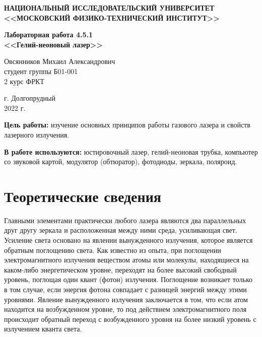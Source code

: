 \documentclass[a4paper,12pt]{article} %
\begin{document}
	
	
	\begin{center}
		
		
		\textbf{НАЦИОНАЛЬНЫЙ ИССЛЕДОВАТЕЛЬСКИЙ УНИВЕРСИТЕТ \\ <<МОСКОВСКИЙ ФИЗИКО-ТЕХНИЧЕСКИЙ ИНСТИТУТ>>}
		\vspace{13ex}
		
		\textbf{Лабораторная работа 4.5.1\\ <<Гелий-неоновый лазер>>}
		\vspace{40ex}
		
		\normalsize{Овсянников Михаил Александрович \\ студент группы Б01-001\\ 2 курс ФРКТ\\}
	\end{center}
	
	\vfill 
	
	\begin{center}
		г. Долгопрудный\\ 
		2022 г.
	\end{center}
	
	
	\thispagestyle{empty} %
	\newpage
	
	
	\textbf{Цель работы:} изучение основных принципов работы газового лазера и свойств лазерного излучения.
	
	
	\textbf{В работе используются:} юстировочный лазер, гелий-неоновая трубка, компьютер со звуковой картой, модулятор (обтюратор), фотодиоды, зеркала, поляроид.
	
	\section*{Теоретические сведения}
	
	Главными элементами практически любого лазера являются два параллельных друг другу зеркала и расположенная между ними среда, усиливающая свет. Усиление света основано на явлении вынужденного излучения, которое является обратным поглощению света. Как известно из опыта, при поглощении электромагнитного излучения веществом атомы или молекулы, находящиеся на каком-либо энергетическом уровне, переходят на более высокий свободный уровень, поглощая один квант (фотон) излучения. Поглощение возникает только в том случае, если энергия фотона совпадает с разницей энергий между этими уровнями. Явление вынужденного излучения заключается в том, что если атом находится на возбужденном уровне, то под действием электромагнитного поля происходит обратный переход с возбужденного уровня на более низкий уровень с излучением кванта света.
	
\end{document}
